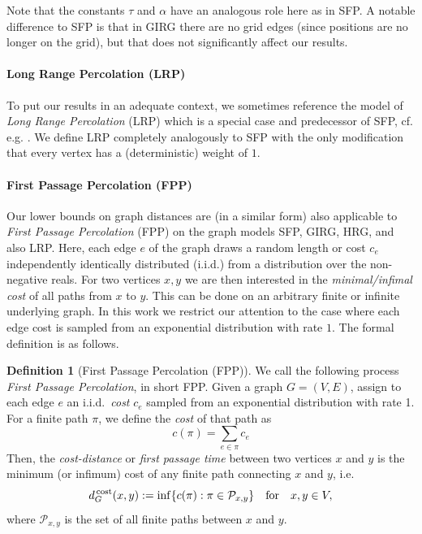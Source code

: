 \documentclass[11pt, letterpaper, margin=1in]{amsart}
\theoremstyle{definition}
\newtheorem{defn}[thm]{Definition}
\theoremstyle{remark}
\newcommand{\graphdistcost}[2]{d^{\hspace{.05cm}\text{cost}}_{G}(#1, #2)}
\numberwithin{equation}{section}
\begin{document}
Note that the constants $\tau$ and $\alpha$ have an analogous role here as in SFP. A notable difference to SFP is that in GIRG there are no grid edges (since positions are no longer on the grid), but that does not significantly affect our results. 
\medskip

\paragraph{\textbf{Long Range Percolation (LRP)}}

To put our results in an adequate context, we sometimes reference the model of \emph{Long Range Percolation} (LRP) which is a special case and predecessor of SFP, cf. e.g. \cite{Biskup_2004, Biskup_Lin_2019}. We define LRP completely analogously to SFP with the only modification that every vertex has a (deterministic) weight of $1$.

\medskip

\paragraph{\textbf{First Passage Percolation (FPP)}}

Our lower bounds on graph distances are (in a similar form) also applicable to \emph{First Passage Percolation} (FPP) on the graph models SFP, GIRG, HRG, and also LRP. 
Here, each edge $e$ of the graph draws a random length or cost $c_{e}$ independently identically distributed (i.i.d.) from a distribution over the non-negative reals. For two vertices $x,y$ we are then interested in the \emph{minimal/infimal cost} of all paths from $x$ to $y$. This can be done on an arbitrary finite or infinite underlying graph. In this work we restrict our attention to the case where each edge cost is sampled from an exponential distribution with rate $1$. The formal definition is as follows.

\begin{defn}[First Passage Percolation (FPP)]\label{def:fpp}
    We call the following process \emph{First Passage Percolation}, in short FPP. Given a graph $G=(V,E)$, assign to each edge $e$ an i.i.d.\ \emph{cost} $c_e$ sampled from an exponential distribution with rate 1. For a finite path $\pi$, we define the \emph{cost} of that path as
    \[c(\pi) = \sum\limits_{e \in \pi}c_e\]
    Then, the \emph{cost-distance} or \emph{first passage time} between two vertices $x$ and $y$ is the minimum (or infimum) cost of any finite path connecting $x$ and $y$, i.e. 
    \[\graphdistcost{x}{y} := \inf\{c(\pi) : \pi \in \mathcal{P}_{x,y}\} \quad \text{for} \quad x,y \in V,\]   
    where $\mathcal{P}_{x,y}$ is the set of all finite paths between $x$ and $y$.
\end{defn}
\end{document}
